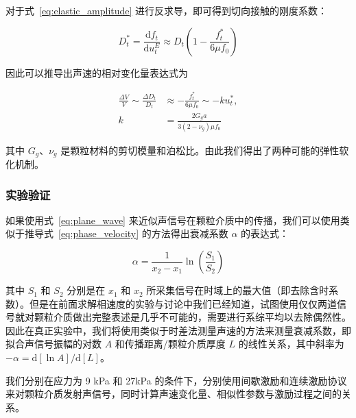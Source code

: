对于式~\eqref{eq:elastic_amplitude} 进行反求导，即可得到切向接触的刚度系数：

\begin{equation}
  D_{t}^{*} = \frac{\mathrm{d}f_{t}}{\mathrm{d}u_{t}^{E}} \approx D_{t}\left(1 - \frac{f_{t}^{*}}{6\mu f_{0}}\right)
\end{equation}

因此可以推导出声速的相对变化量表达式为

\begin{align}
  \frac{\Delta V}{V}\sim \frac{\Delta D_{t}}{D_{t}} &\approx -\frac{f_{t}^{*}}{6\mu f_{0}} \sim -ku_{t}^{*},\\
  k &= \frac{2G_{g}a}{3(2-\nu_{g})\mu f_{0}}\label{eq:friction}
\end{align}

其中 $G_{g}$、$\nu_{g}$ 是颗粒材料的剪切模量和泊松比。由此我们得出了两种可能的弹性软化机制。

\subsubsection{实验验证}

如果使用式~\eqref{eq:plane_wave} 来近似声信号在颗粒介质中的传播，我们可以使用类似于推导式~\eqref{eq:phase_velocity} 的方法得出衰减系数 $\alpha$ 的表达式：

\begin{equation}
  \alpha = \frac{1}{x_{2}-x_{1}}\ln{\left(\frac{S_{1}}{S_{2}}\right)}
\end{equation}

其中 $S_{1}$ 和 $S_{2}$ 分别是在 $x_{1}$ 和 $x_{2}$ 所采集信号在时域上的最大值（即去除含时系数）。但是在前面求解相速度的实验与讨论中我们已经知道，试图使用仅仅两道信号就对颗粒介质做出完整表述是几乎不可能的，需要进行系综平均以去除偶然性。因此在真正实验中，我们将使用类似于时差法测量声速的方法来测量衰减系数，即拟合声信号振幅的对数 $A$ 和传播距离/颗粒介质厚度 $L$ 的线性关系，其中斜率为 $-\alpha = \mathrm{d}[\ln{A}]/\mathrm{d}[L]$。

我们分别在应力为 9 \unit{\kilo\pascal} 和 27\unit{\kilo\pascal} 的条件下，分别使用间歇激励和连续激励协议来对颗粒介质发射声信号，同时计算声速变化量、相似性参数与激励过程之间的关系。

